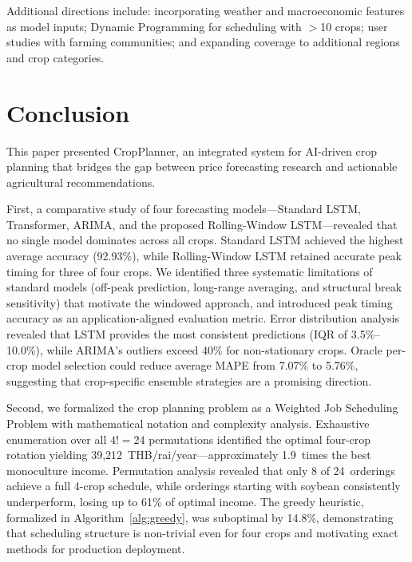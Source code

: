 \documentclass[journal]{IEEEtran}
\begin{document}
Additional directions include: incorporating weather and macroeconomic features as model inputs; Dynamic Programming for scheduling with $>$10 crops; user studies with farming communities; and expanding coverage to additional regions and crop categories.

\section{Conclusion}
\label{sec:conclusion}

This paper presented CropPlanner, an integrated system for AI-driven crop planning that bridges the gap between price forecasting research and actionable agricultural recommendations.

First, a comparative study of four forecasting models---Standard LSTM, Transformer, ARIMA, and the proposed Rolling-Window LSTM---revealed that no single model dominates across all crops. Standard LSTM achieved the highest average accuracy (92.93\%), while Rolling-Window LSTM retained accurate peak timing for three of four crops. We identified three systematic limitations of standard models (off-peak prediction, long-range averaging, and structural break sensitivity) that motivate the windowed approach, and introduced peak timing accuracy as an application-aligned evaluation metric. Error distribution analysis revealed that LSTM provides the most consistent predictions (IQR of 3.5\%--10.0\%), while ARIMA's outliers exceed 40\% for non-stationary crops. Oracle per-crop model selection could reduce average MAPE from 7.07\% to 5.76\%, suggesting that crop-specific ensemble strategies are a promising direction.

Second, we formalized the crop planning problem as a Weighted Job Scheduling Problem with mathematical notation and complexity analysis. Exhaustive enumeration over all $4! = 24$ permutations identified the optimal four-crop rotation yielding 39,212~THB/rai/year---approximately 1.9~times the best monoculture income. Permutation analysis revealed that only 8 of 24~orderings achieve a full 4-crop schedule, while orderings starting with soybean consistently underperform, losing up to 61\% of optimal income. The greedy heuristic, formalized in Algorithm~\ref{alg:greedy}, was suboptimal by 14.8\%, demonstrating that scheduling structure is non-trivial even for four crops and motivating exact methods for production deployment.
\end{document}
